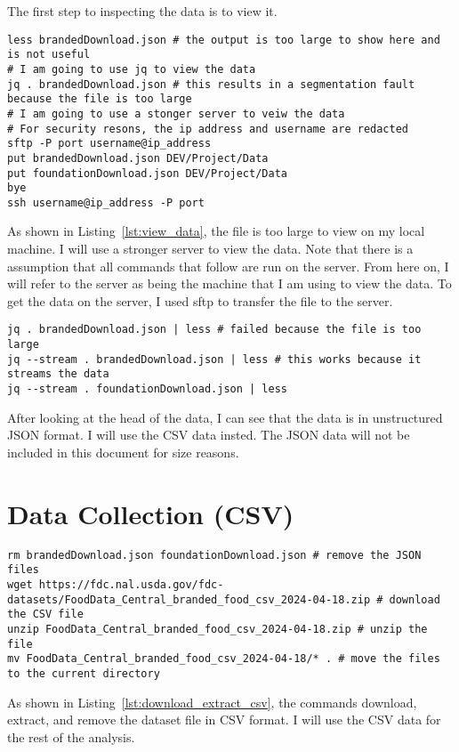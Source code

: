 \documentclass{article}
\begin{document}
The first step to inspecting the data is to view it.

\begin{lstlisting}[caption={View the Data}, label={lst:view_data}]
less brandedDownload.json # the output is too large to show here and is not useful
# I am going to use jq to view the data
jq . brandedDownload.json # this results in a segmentation fault because the file is too large
# I am going to use a stonger server to veiw the data 
# For security resons, the ip address and username are redacted
sftp -P port username@ip_address
put brandedDownload.json DEV/Project/Data
put foundationDownload.json DEV/Project/Data
bye
ssh username@ip_address -P port
\end{lstlisting}

As shown in Listing~\ref{lst:view_data}, the file is too large to view on my local machine. I will use a stronger server to view the data. Note that there is a assumption that all commands that follow are run on the server. From here on, I will refer to the server as being the machine that I am using to view the data. To get the data on the server, I used sftp to transfer the file to the server. 

\begin{lstlisting}[caption={View the Data on the Server}, label={lst:view_data_server}]
jq . brandedDownload.json | less # failed because the file is too large
jq --stream . brandedDownload.json | less # this works because it streams the data
jq --stream . foundationDownload.json | less

\end{lstlisting}

After looking at the head of the data, I can see that the data is in unstructured JSON format. I will use the CSV data insted. The JSON data will not be included in this document for size reasons.

\section{Data Collection (CSV)}
\begin{lstlisting}[caption={Download, Extract, and Remove Zip File}, label={lst:download_extract_csv}]
rm brandedDownload.json foundationDownload.json # remove the JSON files
wget https://fdc.nal.usda.gov/fdc-datasets/FoodData_Central_branded_food_csv_2024-04-18.zip # download the CSV file
unzip FoodData_Central_branded_food_csv_2024-04-18.zip # unzip the file
mv FoodData_Central_branded_food_csv_2024-04-18/* . # move the files to the current directory
\end{lstlisting}
As shown in Listing~\ref{lst:download_extract_csv}, the commands download, extract, and remove the dataset file in CSV format. I will use the CSV data for the rest of the analysis.
\end{document}
